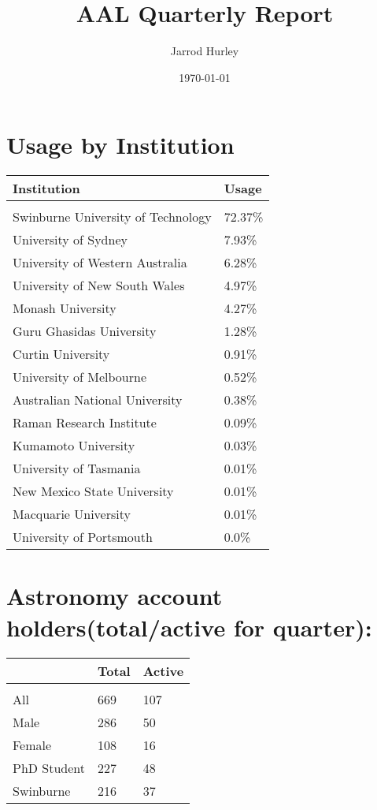 \documentclass{article}%
\title{AAL Quarterly Report}%
\author{Jarrod Hurley}%
\date{\today}%
\begin{document}
%
\normalsize%
\maketitle%
\newpage%
\section{Usage by Institution }%

%
\begin{longtabu}{X[l] X[r]}%
\textbf{Institution}&\textbf{Usage}\\%
\hline%
&\\%
Swinburne University of Technology&72.37\%\\%
\hline%
University of Sydney&7.93\%\\%
\hline%
University of Western Australia&6.28\%\\%
\hline%
University of New South Wales&4.97\%\\%
\hline%
Monash University&4.27\%\\%
\hline%
Guru Ghasidas University&1.28\%\\%
\hline%
Curtin University&0.91\%\\%
\hline%
University of Melbourne&0.52\%\\%
\hline%
Australian National University&0.38\%\\%
\hline%
Raman Research Institute&0.09\%\\%
\hline%
Kumamoto University&0.03\%\\%
\hline%
University of Tasmania&0.01\%\\%
\hline%
New Mexico State University&0.01\%\\%
\hline%
Macquarie University&0.01\%\\%
\hline%
University of Portsmouth&0.0\%\\%
\hline%
\end{longtabu}%
\section{Astronomy account holders(total/active for quarter): }%

%
\begin{longtabu}{X[l] X[r] X[r]}%
\textbf{}&\textbf{Total}&\textbf{Active}\\%
\hline%
&&\\%
All&669&107\\%
\hline%
Male&286&50\\%
\hline%
Female&108&16\\%
\hline%
PhD Student&227&48\\%
\hline%
Swinburne&216&37\\%
\hline%
\end{longtabu}%
\end{document}
